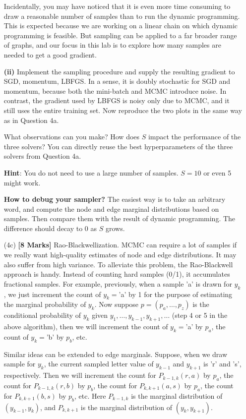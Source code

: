 \documentclass[11pt]{report}
\begin{document}
\begin{itemize}
	Incidentally, you may have noticed that it is even more time consuming to draw a reasonable number of samples than to run the dynamic programming.
	This is expected because we are working on a linear chain on which dynamic programming is feasible.
	But sampling can be applied to a far broader range of graphs,
	and our focus in this lab is to explore how many samples are needed to get a good gradient.
	
	\textbf{(ii)} 
	Implement the sampling procedure and supply the resulting gradient to SGD, momentum, LBFGS.
	In a sense, it is doubly stochastic for SGD and momentum, because both the mini-batch and MCMC introduce noise. 
	In contrast, the gradient used by LBFGS is noisy only due to MCMC,
	and it still uses the entire training set.
	Now reproduce the two plots in the same way as in Question 4a.

	
	What observations can you make?  How does $S$ impact the performance of the three solvers?
	You can directly reuse the best hyperparameters of the three solvers from Question 4a.
		
	\textbf{Hint}: You do not need to use a large number of samples.  $S=10$ or even 5 might work.
	
	\textbf{How to debug your sampler?} The easiest way is to take an arbitrary word, and compute the node and edge marginal distributions based on samples.  Then compare them with the result of dynamic programming.  The difference should decay to 0 as $S$ grows.
	
	\item[(4c)] {\bf [8 Marks]} 
	Rao-Blackwellization. 
	MCMC can require a lot of samples if we really want high-quality estimates of node and edge distributions.
	It may also suffer from high variance.
	To alleviate this problem, the Rao-Blackwell approach is handy.
	Instead of counting hard samples (0/1), it accumulates fractional samples.
	For example, previously, when a sample 'a' is drawn for $y_k$, 
	we just increment the count of $y_k = $'a' by 1 for the purpose of estimating the marginal probability of $y_k$.
	Now suppose $p=(p_a, \ldots, p_z)$ is the conditional probability of $y_k$ given $y_1, \ldots, y_{k-1}, y_{k+1}, \ldots$ (step 4 or 5 in the above algorithm), then we will increment the count of $y_k = $'a' by $p_a$,
	the count of $y_k = $'b' by $p_b$, etc.
	
	Similar ideas can be extended to edge marginals.
	Suppose, when we draw sample for $y_k$, 
	the current sampled letter value of $y_{k-1}$ and $y_{k+1}$ is 'r' and 's', respectively.
	Then we will increment the count for $P_{k-1,k}(r, a)$ by $p_a$, 
	the count for $P_{k-1,k}(r, b)$ by $p_b$, 
	the count for $P_{k,k+1}(a, s)$ by $p_a$, 
	the count for $P_{k,k+1}(b, s)$ by $p_b$, 
	etc.
	Here $P_{k-1,k}$ is the marginal distribution of $(y_{k-1}, y_k)$,
	and $P_{k,k+1}$ is the marginal distribution of $(y_k, y_{k+1})$.
	

\end{itemize}
\end{document}
